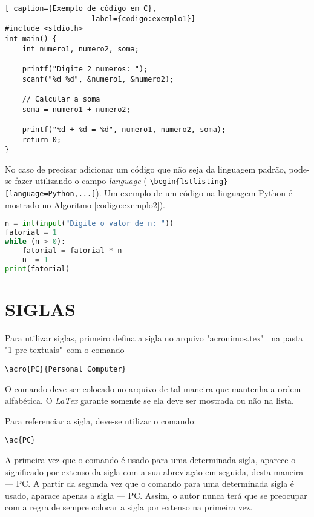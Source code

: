 \begin{lstlisting}[ caption={Exemplo de código em C},
                    label={codigo:exemplo1}]
#include <stdio.h>
int main() {    
    int numero1, numero2, soma;
    
    printf("Digite 2 numeros: ");
    scanf("%d %d", &numero1, &numero2);

    // Calcular a soma
    soma = numero1 + numero2;      
    
    printf("%d + %d = %d", numero1, numero2, soma);
    return 0;
}
\end{lstlisting}

No caso de precisar adicionar um código que não seja da linguagem padrão, pode-se fazer utilizando o campo \textit{language} ( \verb!\begin{lstlisting}[language=Python,...]!). Um exemplo de um código na linguagem Python é mostrado no Algoritmo \ref{codigo:exemplo2}).

\begin{lstlisting}[language=Python,
                    caption={Exemplo de código em Python},
                    label={codigo:exemplo2}]
n = int(input("Digite o valor de n: "))
fatorial = 1
while (n > 0):
    fatorial = fatorial * n
    n -= 1
print(fatorial)
\end{lstlisting}

\section{SIGLAS}
\label{sec:siglas}

Para utilizar siglas, primeiro defina a sigla no arquivo "acronimos.tex"~ na pasta "1-pre-textuais"~com o comando 

 \begingroup
\fontsize{10pt}{12pt}\selectfont
   \verb!\acro{PC}{Personal Computer}!
\endgroup
    
O comando deve ser colocado no arquivo de tal maneira que mantenha a ordem alfabética. O \textit{LaTex} garante somente se ela deve ser mostrada ou não na lista.

Para referenciar a sigla, deve-se utilizar o comando:

\begingroup
\fontsize{10pt}{12pt}\selectfont
\verb!\ac{PC}! \newline
\endgroup

A primeira vez que o comando é usado para uma determinada sigla, aparece o significado por extenso da sigla com a sua abreviação em seguida, desta maneira --- \ac{PC}. A partir da segunda vez que o comando para uma determinada sigla é usado, aparace apenas a sigla --- \ac{PC}. Assim, o autor nunca terá que se preocupar com a regra de sempre colocar a sigla por extenso na primeira vez. 

